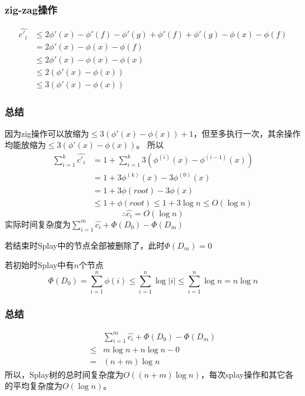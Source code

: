 \documentclass[utf8]{ctexbeamer}
\begin{document}
    \begin{frame}
        \frametitle{zig-zag操作}
        \begin{align}
            \hat{c'_i}&\le2\phi'(x)-\phi'(f)-\phi'(g)+\phi'(f)+\phi'(g)-\phi(x)-\phi(f)\nonumber\\
                      &=2\phi'(x)-\phi(x)-\phi(f)\nonumber\\
                      &\le2\phi'(x)-\phi(x)-\phi(x)\nonumber\\
                      &\le2(\phi'(x)-\phi(x))\nonumber\\
                      &\le3(\phi'(x)-\phi(x))\nonumber
        \end{align}
    \end{frame}

    \begin{frame}
        \frametitle{总结}
        因为zig操作可以放缩为$\le3(\phi'(x)-\phi(x))+1$，但至多执行一次，其余操作均能放缩为$\le3(\phi'(x)-\phi(x))$。
        所以
        \begin{align}
            \sum_{i=1}^{k}\hat{c'_i}&=1+\sum_{i=1}^{k}3(\phi^{(i)}(x)-\phi^{(i-1)}(x))\nonumber\\
                                    &=1+3\phi^{(k)}(x)-3\phi^{(0)}(x)\nonumber\\
                                    &=1+3\phi(root)-3\phi(x)\nonumber\\
                                    &\le1+\phi(root)\le1+3\log n\le O(\log n)\nonumber
        \end{align}
        \[\therefore\hat{c_i}=O(\log n)\]
        实际时间复杂度为$\sum_{i=1}^m\hat{c_i}+\Phi(D_0)-\Phi(D_m)$
            
        若结束时Splay中的节点全部被删除了，此时$\Phi(D_m)=0$

        若初始时Splay中有$n$个节点\[\Phi(D_0)=\sum_{i=1}^{n}\phi(i)\le\sum_{i=1}^{n}\log\left\lvert i\right\rvert\le\sum_{i=1}^{n}\log n=n\log n\]
    \end{frame}

    \begin{frame}
        \frametitle{总结}
        \begin{align}
            &\sum_{i=1}^m\hat{c_i}+\Phi(D_0)-\Phi(D_m)\nonumber\\
            \le&m\log n+n\log n-0\nonumber\\
            =&(n+m)\log n\nonumber
        \end{align}
        所以，Splay树的总时间复杂度为$O((n+m)\log n)$，每次splay操作和其它各的平均复杂度为$O(\log n)$。    
    \end{frame}
\end{document}
